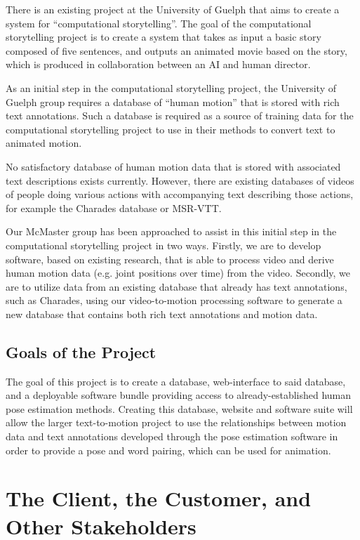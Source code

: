 \documentclass{scrreprt}
\begin{document}
There is an existing project at the University of Guelph that aims to create a
system for ``computational storytelling''. The goal of the computational
storytelling project is to create a system that takes as input a basic story
composed of five sentences, and outputs an animated movie based on the story,
which is produced in collaboration between an AI and human director.

As an initial step in the computational storytelling project, the University of
Guelph group requires a database of ``human motion'' that is stored with rich
text annotations. Such a database is required as a source of training data for
the computational storytelling project to use in their methods to convert text
to animated motion.

No satisfactory database of human motion data that is stored with associated
text descriptions exists currently. However, there are existing databases of
videos of people doing various actions with accompanying text describing those
actions, for example the Charades database or MSR-VTT.

Our McMaster group has been approached to assist in this initial step in the
computational storytelling project in two ways.  Firstly, we are to develop
software, based on existing research, that is able to process video and derive
human motion data (e.g. joint positions over time) from the video. Secondly, we
are to utilize data from an existing database that already has text
annotations, such as Charades, using our video-to-motion processing software to
generate a new database that contains both rich text annotations and motion data.

\subsection{Goals of the Project}

The goal of this project is to create a database, web-interface to said
database, and a deployable software bundle providing access to
already-established human pose estimation methods. Creating this database,
website and software suite will allow the larger text-to-motion project to use
the relationships between motion data and text annotations developed through
the pose estimation software in order to provide a pose and word pairing, which
can be used for animation.

\section{The Client, the Customer, and Other Stakeholders}
\end{document}
